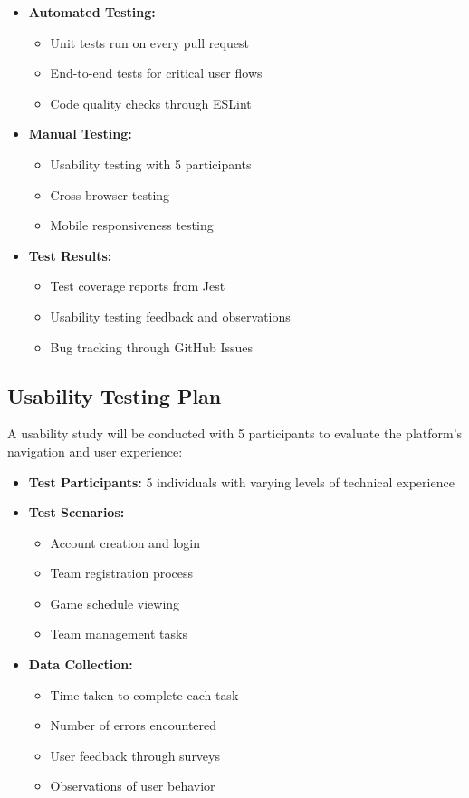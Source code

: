 \documentclass[12pt, titlepage]{article}
\begin{document}
\begin{itemize}
    \item \textbf{Automated Testing:}
    \begin{itemize}
        \item Unit tests run on every pull request
        \item End-to-end tests for critical user flows
        \item Code quality checks through ESLint
    \end{itemize}
    
    \item \textbf{Manual Testing:}
    \begin{itemize}
        \item Usability testing with 5 participants
        \item Cross-browser testing
        \item Mobile responsiveness testing
    \end{itemize}
    
    \item \textbf{Test Results:}
    \begin{itemize}
        \item Test coverage reports from Jest
        \item Usability testing feedback and observations
        \item Bug tracking through GitHub Issues
    \end{itemize}
\end{itemize}

\subsection{Usability Testing Plan}
A usability study will be conducted with 5 participants to evaluate the platform's navigation and user experience:

\begin{itemize}
    \item \textbf{Test Participants:} 5 individuals with varying levels of technical experience
    \item \textbf{Test Scenarios:}
    \begin{itemize}
        \item Account creation and login
        \item Team registration process
        \item Game schedule viewing
        \item Team management tasks
    \end{itemize}
    \item \textbf{Data Collection:}
    \begin{itemize}
        \item Time taken to complete each task
        \item Number of errors encountered
        \item User feedback through surveys
        \item Observations of user behavior
    \end{itemize}
\end{itemize}
\end{document}

